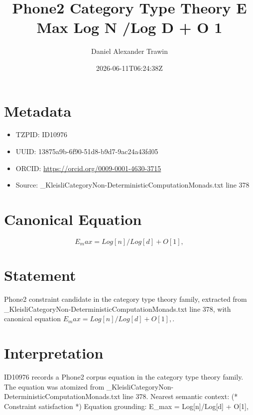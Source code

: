 \documentclass[11pt]{article}
\title{Phone2 Category Type Theory E Max Log N /Log D + O 1}
\author{Daniel Alexander Trawin}
\date{2026-06-11T06:24:38Z}
\begin{document}
\maketitle
\section*{Metadata}
\begin{itemize}
\item TZPID: ID10976
\item UUID: 13875a9b-6f90-51d8-b9d7-9ac24a43fd05
\item ORCID: \url{https://orcid.org/0009-0001-4630-3715}
\item Source: _KleisliCategoryNon-DeterministicComputationMonads.txt line 378
\end{itemize}
\section*{Canonical Equation}
\[
E_max = Log[n]/Log[d] + O[1],
\]
\section*{Statement}
Phone2 constraint candidate in the category type theory family, extracted from _KleisliCategoryNon-DeterministicComputationMonads.txt line 378, with canonical equation $E_max = Log[n]/Log[d] + O[1],$.
\section*{Interpretation}
ID10976 records a Phone2 corpus equation in the category type theory family. The equation was atomized from _KleisliCategoryNon-DeterministicComputationMonads.txt line 378. Nearest semantic context: (* Constraint satisfaction *) Equation grounding: E_max = Log[n]/Log[d] + O[1],
\end{document}
